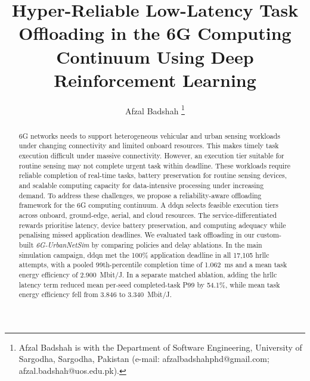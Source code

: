 \documentclass[journal]{IEEEtran}
\begin{document}






\title{Hyper-Reliable Low-Latency Task Offloading in the 6G Computing Continuum Using Deep Reinforcement Learning}

\author{Afzal Badshah
\thanks{Afzal Badshah is with the Department of Software Engineering, University of Sargodha, Sargodha, Pakistan (e-mail: afzalbadshahphd@gmail.com; afzal.badshah@uos.edu.pk).}}%

\maketitle

\begin{abstract}
6G networks needs to support heterogeneous vehicular and urban sensing workloads under changing connectivity and limited onboard resources. This makes timely task execution difficult under massive connectivity.
%
However, an execution tier suitable for routine sensing may not complete urgent task within deadline. These workloads require reliable completion of real-time tasks, battery preservation for routine sensing devices, and scalable computing capacity for data-intensive processing under increasing demand.
%
To address these challenges, we propose a reliability-aware offloading framework for the 6G computing continuum. A \ac{ddqn} selects feasible execution tiers across onboard, ground-edge, aerial, and cloud resources. The service-differentiated rewards prioritise latency, device battery preservation, and computing adequacy while penalising missed application deadlines.
%
We evaluated task offloading in our custom-built \textit{6G-UrbanNetSim} by comparing policies and delay ablations. In the main simulation campaign, \ac{ddqn} met the 100\% application deadline in all 17,105 \ac{hrllc} attempts, with a pooled 99th-percentile completion time of 1.062~ms and a mean task energy efficiency of 2.900~Mbit/J. In a separate matched ablation, adding the \acs{hrllc} latency term reduced mean per-seed completed-task P99 by 54.1\%, while mean task energy efficiency fell from 3.846 to 3.340~Mbit/J. 
\end{abstract}
\end{document}
